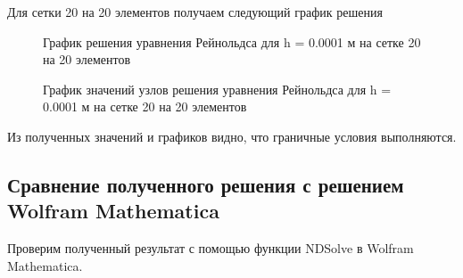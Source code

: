 \documentclass[12pt, a4paper]{article}
\begin{document}
Для сетки 20 на 20 элементов получаем следующий   график решения

\begin{figure}[!htbp]
	\caption{График решения уравнения Рейнольдса для h = 0.0001 м на сетке 20 на 20 элементов}
	\label{20x20mesh}
\end{figure}
\begin{figure}[!htbp]
	\caption{График значений узлов решения уравнения Рейнольдса для h = 0.0001 м на сетке 20 на 20 элементов}
	\label{20x20points}
\end{figure}

Из полученных значений и графиков видно, что граничные условия выполняются.

\subsection{Сравнение полученного решения с решением Wolfram Mathematica}

Проверим полученный результат с помощью функции NDSolve в Wolfram Mathematica.
\end{document}
